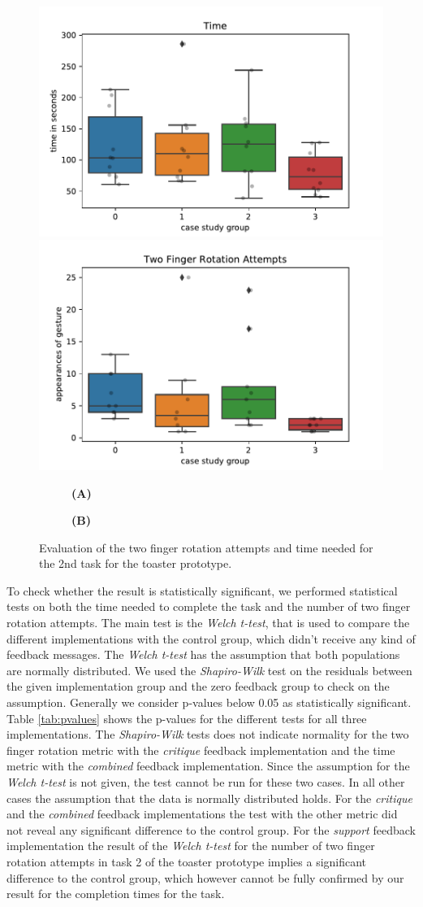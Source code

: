 \documentclass[11pt, a4paper]{article}
\begin{document}
			\begin{figure}[H]
				\centering
				\includegraphics[width=.49\textwidth]{img/plot/plot_bplot_time.pdf}
				\includegraphics[width=.49\textwidth]{img/plot/plot_bplot_tfr.pdf}
				\begin{subfigure}[t]{.49\textwidth}\centering
					\textbf{(A)}
				\end{subfigure}
				\begin{subfigure}[t]{.49\textwidth}\centering
					\textbf{(B)}
				\end{subfigure}
				\caption{Evaluation of the two finger rotation attempts and time needed for the 2nd task for the toaster prototype.}
				\label{fig:t2_metrics}
			\end{figure}

			To check whether the result is statistically significant, we performed statistical tests on both the time needed to complete the task and the number of two finger rotation attempts. The main test is the \emph{Welch t-test}, that is used to compare the different implementations with the control group, which didn't receive any kind of feedback messages. The \emph{Welch t-test} has the assumption that both populations are normally distributed. We used the \emph{Shapiro-Wilk} test on the residuals between the given implementation group and the zero feedback group to check on the assumption. Generally we consider p-values below 0.05 as statistically significant. Table \ref{tab:pvalues} shows the p-values for the different tests for all three implementations. The \emph{Shapiro-Wilk} tests does not indicate normality for the two finger rotation metric with the \emph{critique} feedback implementation and the time metric with the \emph{combined} feedback implementation. Since the assumption for the \emph{Welch t-test} is not given, the test cannot be run for these two cases. In all other cases the assumption that the data is normally distributed holds. For the \emph{critique} and the \emph{combined} feedback implementations the test with the other metric did not reveal any significant difference to the control group. For the \emph{support} feedback implementation the result of the \emph{Welch t-test} for the number of two finger rotation attempts in task 2 of the toaster prototype implies a significant difference to the control group, which however cannot be fully confirmed by our result for the completion times for the task.
\end{document}
